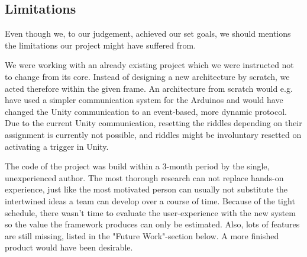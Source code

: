 \subsection{Limitations}
Even though we, to our judgement, achieved our set goals, 
we should mentions the limitations our project might have suffered from.

We were working with an already existing project which we were instructed not to change from its core. 
Instead of designing a new architecture by scratch, we acted therefore within the given frame. 
An architecture from scratch would e.g. have used a simpler communication system for the Arduinos and would have changed 
the Unity communication to an event-based, more dynamic protocol.  
Due to the current Unity communication, resetting the riddles depending on their assignment
is currently not possible, and riddles might be involuntary resetted on activating a trigger in Unity.

The code of the project was build within a 3-month period by the single, unexperienced author.
The most thorough research can not replace hands-on experience, 
just like the most motivated person can usually not substitute the intertwined ideas a team can develop over a course of time.
Because of the tight schedule, there wasn't time to evaluate the user-experience with the new system so the value the framework produces can only be estimated.
Also, lots of features are still missing, listed in the "Future Work"-section below.
A more finished product would have been desirable.

